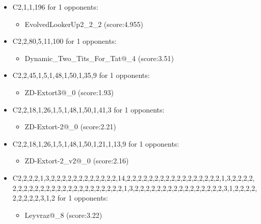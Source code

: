 \begin{appendices}
\begin{itemize}
        \item C2,1,1,196 for 1 opponents:
        \begin{multicols}{3}
            \begin{itemize}
                \item EvolvedLookerUp2\_2\_2 (score:4.955)
            \end{itemize}
        \end{multicols}

        \item C2,2,80,5,11,100 for 1 opponents:
        \begin{multicols}{3}
            \begin{itemize}
                \item Dynamic\_Two\_Tits\_For\_Tat@\_4 (score:3.51)
            \end{itemize}
        \end{multicols}

        \item C2,2,45,1,5,1,48,1,50,1,35,9 for 1 opponents:
        \begin{multicols}{3}
            \begin{itemize}
                \item ZD-Extort3@\_0 (score:1.93)
            \end{itemize}
        \end{multicols}

        \item C2,2,18,1,26,1,5,1,48,1,50,1,41,3 for 1 opponents:
        \begin{multicols}{3}
            \begin{itemize}
                \item ZD-Extort-2@\_0 (score:2.21)
            \end{itemize}
        \end{multicols}

        \item C2,2,18,1,26,1,5,1,48,1,50,1,21,1,13,9 for 1 opponents:
        \begin{multicols}{3}
            \begin{itemize}
                \item ZD-Extort-2\_v2@\_0 (score:2.16)
            \end{itemize}
        \end{multicols}

        \item C2,2,2,2,1,3,2,2,2,2,2,2,2,2,2,2,2,2,14,2,2,2,2,2,2,2,2,2,2,2,2,2,2,2,2,2,1,3,2,2,2,2,2,2,2,2,2,2,2,2,2,2,2,2,2,2,2,2,2,2,2,2,1,3,2,2,2,2,2,2,2,2,2,2,2,2,2,2,2,2,3,1,2,2,2,2,2,2,2,2,2,3,1,2 for 1 opponents:
        \begin{multicols}{3}
            \begin{itemize}
                \item Leyvraz@\_8 (score:3.22)
            \end{itemize}
        \end{multicols}


\end{itemize}
\end{appendices}
